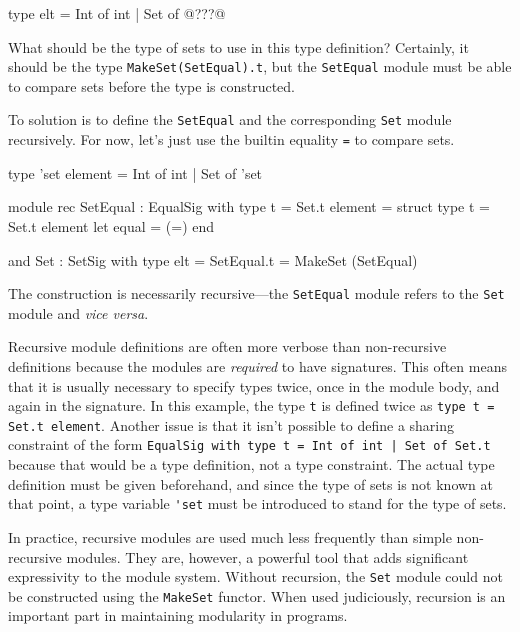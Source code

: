 \begin{ocamly}
type elt = Int of int | Set of @???@
\end{ocamly}
%
What should be the type of sets to use in this type definition?
Certainly, it should be the type
%
\hbox{\lstinline$MakeSet(SetEqual).t$},
%
but the \hbox{\lstinline$SetEqual$} module must be able to compare sets
before the type is constructed.

To solution is to define the \hbox{\lstinline$SetEqual$} and the corresponding
%
\hbox{\lstinline$Set$} module recursively.
%
For now, let's just use the builtin equality \hbox{\lstinline$=$} to compare
sets.

\begin{ocaml}
type 'set element = Int of int | Set of 'set

module rec SetEqual
 : EqualSig with type t = Set.t element =
struct
    type t = Set.t element
    let equal = (=)
end

and Set : SetSig with type elt = SetEqual.t = MakeSet (SetEqual)
\end{ocaml}
%
The construction is necessarily
recursive---the \hbox{\lstinline$SetEqual$} module refers to
the \hbox{\lstinline$Set$} module and \textit{vice versa}.

Recursive module definitions are often more verbose than non-recursive
definitions because the modules are \emph{required} to have
signatures.  This often means that it is usually necessary to specify
types twice, once in the module body, and again in the signature.  In
this example, the type \hbox{\lstinline$t$} is defined twice as
%
\hbox{\lstinline$type t = Set.t element$}.
%
Another issue is that it isn't possible to define a sharing constraint
of the form
%
\hbox{\lstinline$EqualSig with type t = Int of int | Set of Set.t$}
%
because that would be a type definition, not a type constraint.  The
actual type definition must be given beforehand, and since the type of
sets is not known at that point, a type
variable \hbox{\lstinline$'set$} must be introduced to stand for the
type of sets.

In practice, recursive modules are used much less frequently than
simple non-recursive modules.  They are, however, a powerful tool that
adds significant expressivity to the module system.  Without
recursion, the \hbox{\lstinline$Set$} module could not be constructed
using the \hbox{\lstinline$MakeSet$} functor.  When used judiciously,
recursion is an important part in maintaining modularity in programs.


